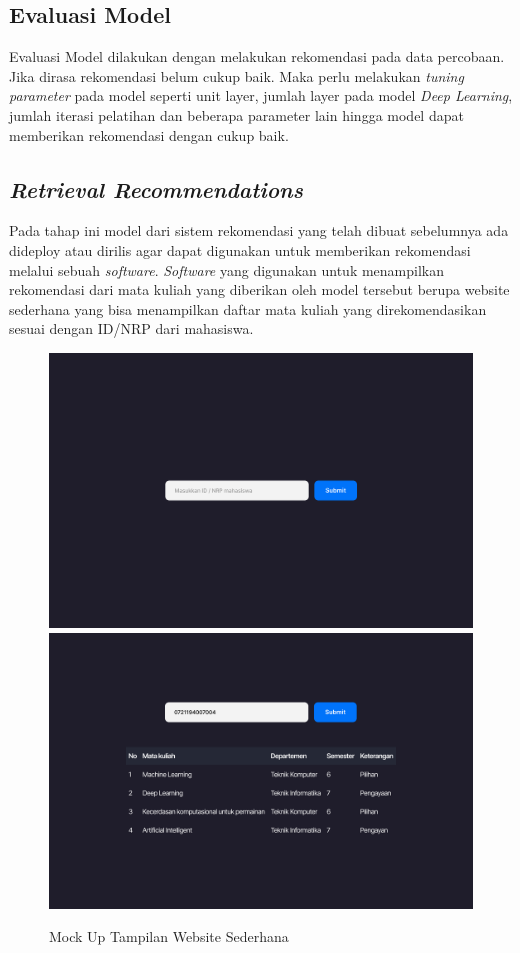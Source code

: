 \begin{adjustwidth}{1em}{0pt}
  \subsection{Evaluasi Model}
  Evaluasi Model dilakukan dengan melakukan rekomendasi pada data percobaan. Jika dirasa rekomendasi belum cukup baik. Maka perlu melakukan \emph{tuning parameter} pada model seperti unit layer,
  jumlah layer pada model \emph{Deep Learning}, jumlah iterasi pelatihan dan beberapa parameter lain hingga model dapat memberikan rekomendasi dengan cukup baik.

  \subsection{\emph{Retrieval Recommendations}}
  Pada tahap ini model dari sistem rekomendasi yang telah dibuat sebelumnya ada dideploy atau dirilis agar dapat digunakan untuk memberikan rekomendasi melalui sebuah \emph{software}.
  \emph{Software} yang digunakan untuk menampilkan rekomendasi dari mata kuliah yang diberikan oleh model tersebut berupa website sederhana yang bisa menampilkan daftar mata kuliah
  yang direkomendasikan sesuai dengan ID/NRP dari mahasiswa.

  \begin{figure} [ht] \centering
    \includegraphics[width=150mm]{gambar/mockup-1.png}
    \includegraphics[width=150mm]{gambar/mockup-2.png}
    \caption{Mock Up Tampilan Website Sederhana}
  \end{figure}

\end{adjustwidth}



